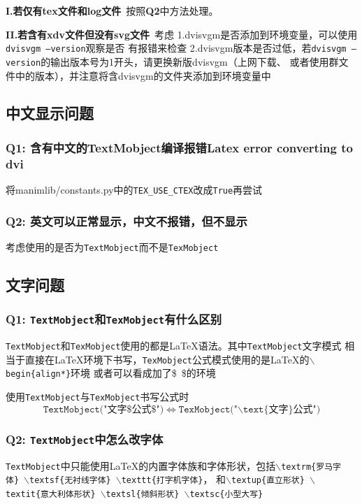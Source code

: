 \documentclass[UTF8]{ctexart}
\begin{document}
\textbf{I.若仅有tex文件和log文件}\ 按照\textbf{Q2}中方法处理。

\textbf{II.若含有xdv文件但没有svg文件}\ 考虑 1.dvisvgm是否添加到环境变量，可以使用\texttt{dvisvgm --version}观察是否
有报错来检查 2.dvisvgm版本是否过低，若\texttt{dvisvgm --version}的输出版本号为1开头，请更换新版dvisvgm（上网下载、
或者使用群文件中的版本），并注意将含dvisvgm的文件夹添加到环境变量中

\subsection{中文显示问题}
\subsubsection*{Q1: 含有中文的TextMobject编译报错Latex error converting to dvi}
将manimlib/constants.py中的\texttt{TEX\_USE\_CTEX}改成\texttt{True}再尝试

\subsubsection*{Q2: 英文可以正常显示，中文不报错，但不显示}
考虑使用的是否为\texttt{TextMobject}而不是\texttt{TexMobject}

\subsection{文字问题}
\subsubsection*{Q1: \texttt{TextMobject}和\texttt{TexMobject}有什么区别}
\texttt{TextMobject}和\texttt{TexMobject}使用的都是\LaTeX 语法。其中\texttt{TextMobject}文字模式
相当于直接在\LaTeX 环境下书写，\texttt{TexMobject}公式模式使用的是\LaTeX 的\texttt{$\backslash$begin\{align*\}}环境
或者可以看成加了\$\ \$的环境

使用\texttt{TextMobject}与\texttt{TexMobject}书写公式时
$$
\texttt{TextMobject("}\text{文字}\texttt{\$}\text{公式}\texttt{\$")} \iff \texttt{TexMobject("}\mathtt{\backslash}
\texttt{text\{}\text{文字}\texttt{\}}\text{公式}\texttt{")}
$$

\subsubsection*{Q2: \texttt{TextMobject}中怎么改字体}
\texttt{TextMobject}中只能使用\LaTeX 的内置字体族和字体形状，包括\texttt{$\backslash$textrm\{罗马字体\}}\ 
\texttt{$\backslash$textsf\{无衬线字体\}}\ \texttt{$\backslash$texttt\{打字机字体\}}，
和\texttt{$\backslash$textup\{直立形状\}}\ \texttt{$\backslash$textit\{意大利体形状\}}\ 
\texttt{$\backslash$textsl\{倾斜形状\}}\ \texttt{$\backslash$textsc\{小型大写\}}
\end{document}
